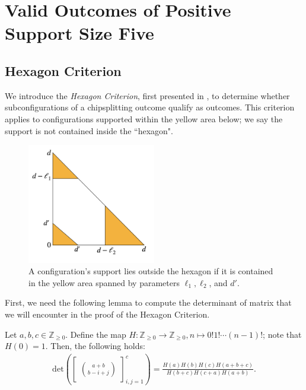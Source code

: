 \chapter{Valid Outcomes of Positive Support Size Five}

\section{Hexagon Criterion}

We introduce the \emph{Hexagon Criterion}, first presented in \cite{bik2022classifying}, to determine whether subconfigurations of a chipsplitting outcome qualify as outcomes. This criterion applies to configurations supported within the yellow area below; we say the support is not contained inside the ``hexagon".

\begin{figure}[H]
    \centering
    \includegraphics[width=0.5\textwidth]{assets/hexagon.png}
    \caption{A configuration's support lies outside the hexagon if it is contained in the yellow area spanned by parameters \( \ell_1, \ell_2 \), and \( d' \).}     \label{fig:hexagon}
\end{figure}

First, we need the following lemma to compute the determinant of matrix that we will encounter in the proof of the Hexagon Criterion.

\begin{lemma}\label{lemma:grinberghyperfactorial}
    Let \( a,b,c \in \mathbb{Z}_{\geq 0} \). Define the map \( H:  \mathbb{Z}_{\geq 0} \to  \mathbb{Z}_{\geq 0}, n \mapsto 0! 1! \cdots (n-1)! \); note that \( H(0) = 1 \). Then, the following holds:
    \begin{align*}
        \mathrm{det}\left(\begin{bmatrix}
            \binom{a+b}{b-i+j}
        \end{bmatrix}_{i,j = 1}^c\right) = \frac{H(a)H(b)H(c)H(a+b+c)}{H(b+c)H(c+a)H(a+b)}.
    \end{align*} 
\end{lemma}

